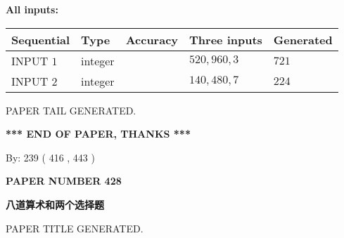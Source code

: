 \documentclass{ctexart}
\begin{document}
   
   
   
\noindent\vspace{0.1in}\hspace{-0.08in} {\textbf{\Large{All inputs: }}}
   
   
  
  
\noindent\begin{tabular}{|l|l|l|l|l|}
\hline
 Sequential & Type & Accuracy & Three inputs & Generated \\ 
\hline
 
 
  INPUT $  1 $ & integer &  & $
 520
 , 
 960
 , 
 3
 $ & $ 721 $ 
 \\  \hline  
 
 
  INPUT $  2 $ & integer &  & $
 140
 , 
 480
 , 
 7
 $ & $ 224 $ 
 \\  \hline  
 \end{tabular}
   
   
   
   
   
   
 \vspace{0.2in}
 
   
   
\vspace{2.0in} PAPER TAIL GENERATED.
   
   
   
   
\vspace{1.0in} 
{\textbf{\large{ *** END OF PAPER, THANKS *** }}} 
   
   
\hspace{1.0in} By: 
 239 ( 416 ,  443 )
   
   
   
   
\newpage 
\setcounter{page}{ 
   428001 } 
   
   
   
   
 {\textbf{ \Large{ PAPER NUMBER  428  }}}
   
   
\vspace{0.2in}
   
   
   
   
   
   
   
   
 \vspace{0.2in}
{\LARGE {\textbf{ 八道算术和两个选择题}}}
   
   
 PAPER TITLE GENERATED.
   
   
   
\vspace{0.2in}
   
\end{document}
